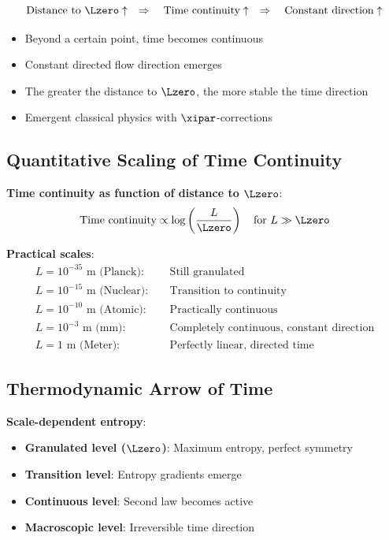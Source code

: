 	\begin{tcolorbox}[colback=blue!5!white,colframe=blue!75!black,title=Central Insight]
		\begin{equation}
			\text{Distance to } \Lzero \uparrow \quad \Rightarrow \quad \text{Time continuity} \uparrow \quad \Rightarrow \quad \text{Constant direction} \uparrow
		\end{equation}
	\end{tcolorbox}
	
	\begin{itemize}
		\item Beyond a certain point, time becomes continuous
		\item Constant directed flow direction emerges
		\item The greater the distance to $\Lzero$, the more stable the time direction
		\item Emergent classical physics with $\xipar$-corrections
	\end{itemize}
	
	\subsection{Quantitative Scaling of Time Continuity}
	
	\textbf{Time continuity as function of distance to $\Lzero$}:
	\begin{equation}
		\text{Time continuity} \propto \log\left(\frac{L}{\Lzero}\right) \quad \text{for } L \gg \Lzero
	\end{equation}
	
	\textbf{Practical scales}:
	\begin{align}
		L = 10^{-35}\text{ m (Planck)}: &\quad \text{Still granulated} \\
		L = 10^{-15}\text{ m (Nuclear)}: &\quad \text{Transition to continuity} \\
		L = 10^{-10}\text{ m (Atomic)}: &\quad \text{Practically continuous} \\
		L = 10^{-3}\text{ m (mm)}: &\quad \text{Completely continuous, constant direction} \\
		L = 1\text{ m (Meter)}: &\quad \text{Perfectly linear, directed time}
	\end{align}
	
	\subsection{Thermodynamic Arrow of Time}
	
	\textbf{Scale-dependent entropy}:
	\begin{itemize}
		\item \textbf{Granulated level ($\Lzero$)}: Maximum entropy, perfect symmetry
		\item \textbf{Transition level}: Entropy gradients emerge
		\item \textbf{Continuous level}: Second law becomes active
		\item \textbf{Macroscopic level}: Irreversible time direction
	\end{itemize}
	
